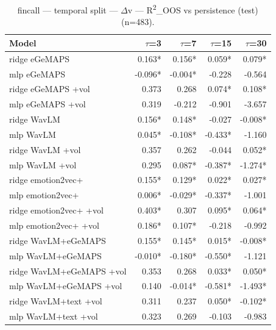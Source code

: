 \begin{table}[t]
\centering
\begin{tabular}{lrrrr}
\toprule
Model & $\tau$=3 & $\tau$=7 & $\tau$=15 & $\tau$=30 \\
\midrule
ridge eGeMAPS & 0.163* & 0.156* & 0.059* & 0.079* \\
mlp eGeMAPS & -0.096* & -0.004* & -0.228 & -0.564 \\
ridge eGeMAPS +vol & 0.373 & 0.268 & 0.074* & 0.108* \\
mlp eGeMAPS +vol & 0.319 & -0.212 & -0.901 & -3.657 \\
ridge WavLM & 0.156* & 0.148* & -0.027 & -0.008* \\
mlp WavLM & 0.045* & -0.108* & -0.433* & -1.160 \\
ridge WavLM +vol & 0.357 & 0.262 & -0.044 & 0.052* \\
mlp WavLM +vol & 0.295 & 0.087* & -0.387* & -1.274* \\
ridge emotion2vec+ & 0.155* & 0.129* & 0.022* & 0.027* \\
mlp emotion2vec+ & 0.006* & -0.029* & -0.337* & -1.001 \\
ridge emotion2vec+ +vol & 0.403* & 0.307 & 0.095* & 0.064* \\
mlp emotion2vec+ +vol & 0.186* & 0.107* & -0.218 & -0.992 \\
ridge WavLM+eGeMAPS & 0.155* & 0.145* & 0.015* & -0.008* \\
mlp WavLM+eGeMAPS & -0.010* & -0.180* & -0.550* & -1.121 \\
ridge WavLM+eGeMAPS +vol & 0.353 & 0.268 & 0.033* & 0.050* \\
mlp WavLM+eGeMAPS +vol & 0.140 & -0.014* & -0.581* & -1.493* \\
ridge WavLM+text +vol & 0.311 & 0.237 & 0.050* & -0.102* \\
mlp WavLM+text +vol & 0.323 & 0.269 & -0.103 & -0.983 \\
\bottomrule
\end{tabular}
\caption{fincall — temporal split — $\Delta$v — R\textsuperscript{2}\_OOS vs persistence (test) (n=483).}
\end{table}

